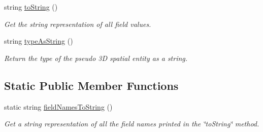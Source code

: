 \begin{DoxyCompactItemize}
string \hyperlink{classmultiscale_1_1analysis_1_1SpatialEntityPseudo3D_abea1af0695f6f1a977b0caa3428fc433}{to\-String} ()
\begin{DoxyCompactList}\small\item\em Get the string representation of all field values. \end{DoxyCompactList}\item 
string \hyperlink{classmultiscale_1_1analysis_1_1SpatialEntityPseudo3D_ae8b5c03174d91efc64509dec1a01e69c}{type\-As\-String} ()
\begin{DoxyCompactList}\small\item\em Return the type of the pseudo 3\-D spatial entity as a string. \end{DoxyCompactList}\end{DoxyCompactItemize}
\subsection*{Static Public Member Functions}
\begin{DoxyCompactItemize}
\item 
static string \hyperlink{classmultiscale_1_1analysis_1_1SpatialEntityPseudo3D_a3c24e3f06c999002f18e1ddd8be3f927}{field\-Names\-To\-String} ()
\begin{DoxyCompactList}\small\item\em Get a string representation of all the field names printed in the \char`\"{}to\-String\char`\"{} method. \end{DoxyCompactList}\end{DoxyCompactItemize}
